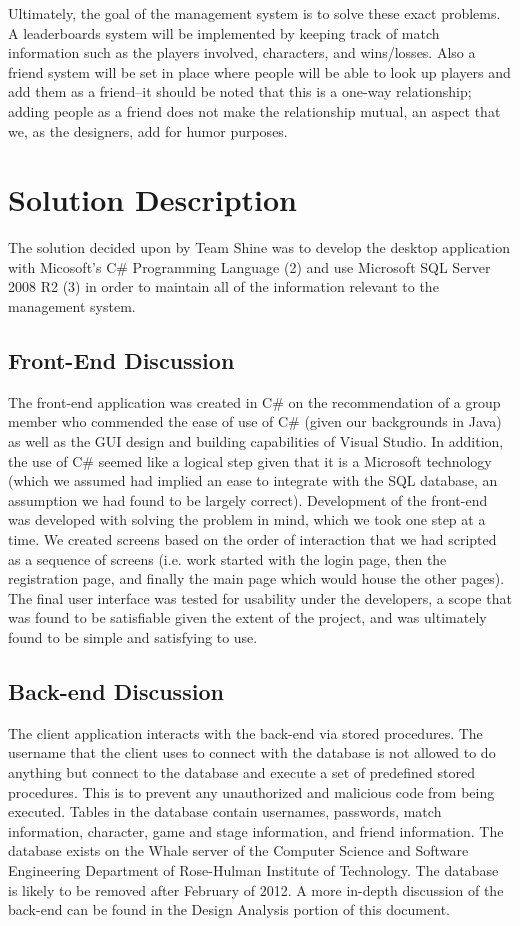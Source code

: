 \documentclass{article}
\begin{document}
Ultimately, the goal of the management system is to solve these exact problems.  A leaderboards system will be implemented by keeping track of match information such as the players involved, characters, and wins/losses.  Also a friend system will be set in place where people will be able to look up players and add them as a friend--it should be noted that this is a one-way relationship; adding people as a friend does not make the relationship mutual, an aspect that we, as the designers, add for humor purposes.

\section{Solution Description}
The solution decided upon by Team Shine was to develop the desktop application with Micosoft's C\# \label{csharp} Programming Language (2) and use Microsoft SQL Server 2008 R2 (3) in order to maintain all of the information relevant to the management system.
\subsection{Front-End Discussion}
The front-end application was created in C\# on the recommendation of a group member who commended the ease of use of C\# (given our backgrounds in Java) as well as the GUI design and building capabilities of Visual Studio\label{vstudio}.  In addition, the use of C\# seemed like a logical step given that it is a Microsoft technology (which we assumed had implied an ease to integrate with the SQL database, an assumption we had found to be largely correct).  Development of the front-end was developed with solving the problem in mind, which we took one step at a time.  We created screens based on the order of interaction that we had scripted as a sequence of screens (i.e. work started with the login page, then the registration page, and finally the main page which would house the other pages).  The final user interface was tested for usability under the developers, a scope that was found to be satisfiable given the extent of the project, and was ultimately found to be simple and satisfying to use.
\subsection{Back-end Discussion}
The client application interacts with the back-end via stored procedures. The username that the client uses to connect with the database is not allowed to do anything but connect to the database and execute a set of predefined stored procedures. This is to prevent any unauthorized and malicious code from being executed. Tables in the database contain usernames, passwords, match information, character, game and stage information, and friend information. The database exists on the Whale server of the Computer Science and Software Engineering Department of Rose-Hulman Institute of Technology. The database is likely to be removed after February of 2012. A more in-depth discussion of the back-end can be found in the Design Analysis portion of this document.
\end{document}

